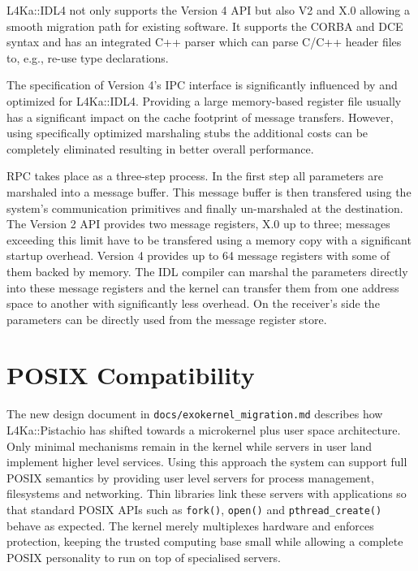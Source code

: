 \documentclass[twoside]{whitepaper}
\newcommand{\Pistachio}{L4Ka::Pistachio\xspace}
\newcommand{\IDL}{L4Ka::IDL4\xspace}
\begin{document}
\IDL not only supports the Version 4 API but also V2 and X.0 allowing a
smooth migration path for existing software.  It supports the CORBA
and DCE syntax and has an integrated C++ parser which can parse
C/C++ header files to, e.g., re-use type declarations.

The specification of Version 4's IPC interface is significantly
influenced by and optimized for \IDL.  Providing a large memory-based
register file usually has a significant impact on the cache footprint of
message transfers.  However, using specifically optimized marshaling
stubs the additional costs can be completely eliminated resulting in
better overall performance.

RPC takes place as a three-step process.  In the first step all
parameters are marshaled into a message buffer.  This message buffer
is then transfered using the system's communication primitives and finally
un-marshaled at the destination.  The Version 2 API provides two message
registers, X.0 up to three; messages exceeding this limit have to be
transfered using a memory copy with a significant startup overhead.
Version 4 provides up to 64 message registers with some of them
backed by memory.  The IDL compiler can marshal the parameters directly
into these message registers and the kernel can transfer them from
one address space to another with significantly less overhead.  On the
receiver's side the parameters can be directly used from the message
register store.

\section{POSIX Compatibility}
The new design document in \texttt{docs/exokernel\_migration.md}
describes how \Pistachio has shifted towards a microkernel plus user
space architecture.  Only minimal mechanisms remain in the kernel while
servers in user land implement higher level services.  Using this
approach the system can support full POSIX semantics by providing user
level servers for process management, filesystems and networking.  Thin
libraries link these servers with applications so that standard POSIX
APIs such as \texttt{fork()}, \texttt{open()} and \texttt{pthread\_create()}
behave as expected.  The kernel merely multiplexes hardware and enforces
protection, keeping the trusted computing base small while allowing a
complete POSIX personality to run on top of specialised servers.
\end{document}
